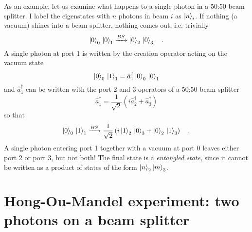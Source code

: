 As an example, let us examine what happens to a single photon in a 50:50 beam splitter. I label the eigenstates
with $n$ photons in beam $i$ as $\ket{n}_i$. If nothing (a vacuum) shines into a beam splitter, nothing comes out, i.e. trivially
\begin{equation}
    \ket{0}_0 \,  \ket{0}_1  \xrightarrow{BS}  \ket{0}_2 \,  \ket{0}_3 \quad .
\end{equation}
A single photon at port 1 is written by the creation operator acting on the vacuum state
\begin{equation}
    \ket{0}_0 \,  \ket{1}_1 = \hat{a}^\dagger_1 \ket{0}_0 \,  \ket{0}_1 
\end{equation}
and $\hat{a}^\dagger_1$ can be written with the port 2 and 3 operators of a 50:50 beam splitter
\begin{equation}
    \hat{a}^\dagger_1 = \frac{1}{\sqrt{2}} \left( i \hat{a}^\dagger_2 + \hat{a}^\dagger_3 \right)
\end{equation}
so that 
\begin{equation}
    \ket{0}_0 \,  \ket{1}_1  \xrightarrow{BS} \frac{1}{\sqrt{2}} \left( i   \ket{1}_2 \,  \ket{0}_3 +   \ket{0}_2 \,  \ket{1}_3 \right) \quad .
\end{equation}
A single photon entering port 1 together with a vacuum at port 0 leaves either port 2 or port 3, but not both! The final state is a \emph{entangled state}, since it cannot be written as a product of states of the form $\ket{n}_2 \ket{m}_3$.




\section{Hong-Ou-Mandel experiment: two photons on a beam splitter}

